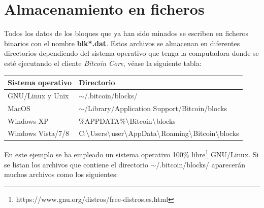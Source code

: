 \documentclass{article}
\begin{document}
\section{Almacenamiento en ficheros}
    Todos los datos de los bloques que ya han sido minados se escriben en ficheros binarios con el nombre \textbf{blk*.dat}. Estos archivos se almacenan en diferentes directorios dependiendo del sistema operativo que tenga la computadora donde se esté ejecutando el cliente \textit{Bitcoin Core}, véase la siguiente tabla:
    
    \begin{table}[H]
    \centering
    \begin{tabular}{| l | l |} 
        \hline
        Sistema operativo & Directorio \\
        \hline
        GNU/Linux y Unix & $\sim$/.bitcoin/blocks/ \\
        \hline
        MacOS & $\sim$/Library/Application Support/Bitcoin/blocks \\
        \hline
        Windows XP & \%APPDATA\%$\char`\\$Bitcoin$\char`\\$blocks \\
        \hline
        Windows Vista/7/8 & C:$\char`\\$Users$\char`\\$user$\char`\\$AppData$\char`\\$Roaming$\char`\\$Bitcoin$\char`\\$blocks \\
        \hline
    \end{tabular}
    \label{table:2}
    \end{table}
        
    En este ejemplo se ha empleado un sistema operativo 100\% libre\footnote{https://www.gnu.org/distros/free-distros.es.html} GNU/Linux. Si se listan los archivos que contiene el directorio $\sim$/.bitcoin/blocks/ aparecerán muchos archivos como los siguientes:
    
\end{document}
